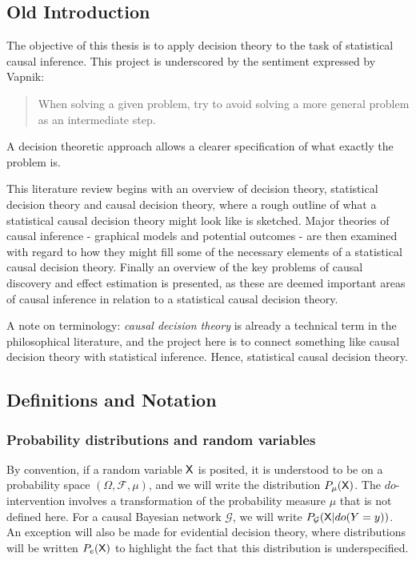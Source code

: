 \subsection{Old Introduction}

The objective of this thesis is to apply decision theory to the task of statistical causal inference.  This project is underscored by the sentiment expressed by Vapnik\cite{vapnik_nature_2013}:

\begin{quote}
    When solving a given problem, try to avoid solving a more general problem as an intermediate step.
\end{quote}

A decision theoretic approach allows a clearer specification of what exactly the problem is.

This literature review begins with an overview of decision theory, statistical decision theory and causal decision theory, where a rough outline of what a statistical causal decision theory might look like is sketched. Major theories of causal inference - graphical models and potential outcomes - are then examined with regard to how they might fill some of the necessary elements of a statistical causal decision theory. Finally an overview of the key problems of causal discovery and effect estimation is presented, as these are deemed important areas of causal inference in relation to a statistical causal decision theory.

A note on terminology: \emph{causal decision theory} is already a technical term in the philosophical literature, and the project here is to connect something like causal decision theory with statistical inference. Hence, statistical causal decision theory.


\subsection{Definitions and Notation}

\subsubsection{Probability distributions and random variables}

By convention, if a random variable $\mathsf{X}$ is posited, it is understood to be on a probability space $(\Omega,\mathcal{F},\mu)$, and we will write the distribution $P_\mu(\mathsf{X})$. The $do$-intervention involves a transformation of the probability measure $\mu$ that is not defined here. For a causal Bayesian network $\mathcal{G}$, we will write $P_{\mathcal{G}}(\mathsf{X}|do(Y=y))$. An exception will also be made for evidential decision theory, where distributions will be written $P_e(\mathsf{X})$ to highlight the fact that this distribution is underspecified.

